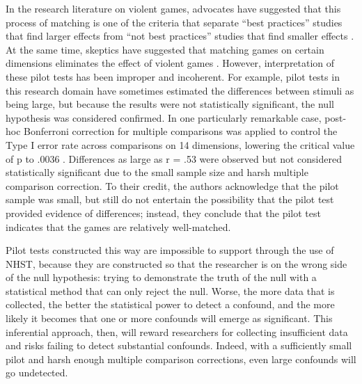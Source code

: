 \documentclass[fignum,nobf,man]{apa}
\begin{document}
In the research literature on violent games, advocates have suggested that this process of matching is one of the criteria that separate ``best practices'' studies that find larger effects from ``not best practices'' studies that find smaller effects \citep{Anderson:etal:2010}. At the same time, skeptics have suggested that matching games on certain dimensions eliminates the effect of violent games \citep{Adachi:Willoughby:2011}. However, interpretation of these pilot tests has been improper and incoherent. For example, pilot tests in this research domain have sometimes estimated the differences between stimuli as being large, but because the results were not statistically significant, the null hypothesis was considered confirmed. In one particularly remarkable case, post-hoc Bonferroni correction for multiple comparisons was applied to control the Type I error rate across comparisons on 14 dimensions, lowering the critical value of p to .0036 \citep{Arriaga:etal:2008}. Differences as large as r = .53 were observed but not considered statistically significant due to the small sample size and harsh multiple comparison correction. To their credit, the authors acknowledge that the pilot sample was small, but still do not entertain the possibility that the pilot test provided evidence of differences; instead, they conclude that the pilot test indicates that the games are relatively well-matched.

Pilot tests constructed this way are impossible to support through the use of NHST, because they are constructed so that the researcher is on the wrong side of the null hypothesis: trying to demonstrate the truth of the null with a statistical method that can only reject the null. Worse, the more data that is collected, the better the statistical power to detect a confound, and the more likely it becomes that one or more confounds will emerge as significant. This inferential approach, then, will reward researchers for collecting insufficient data and risks failing to detect substantial confounds. Indeed, with a sufficiently small pilot and harsh enough multiple comparison corrections, even large confounds will go undetected.

\end{document}
